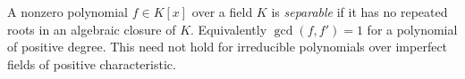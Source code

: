 
A nonzero polynomial $f\in K[x]$ over a field $K$ is \emph{separable} if it has no repeated roots in an algebraic closure of $K$. Equivalently $\gcd(f,f')=1$ for a polynomial of positive degree. This need not hold for irreducible polynomials over imperfect fields of positive characteristic.
